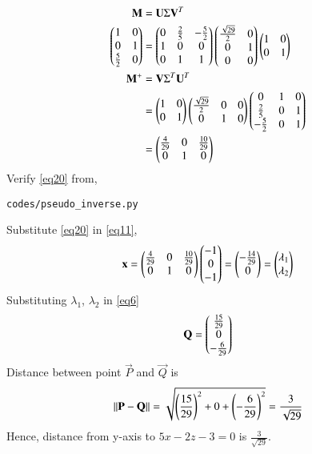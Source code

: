 \documentclass[journal,12pt,twocolumn]{IEEEtran}
\begin{document}
\begin{align}
	\label{eq16}\mathbf{M} &= \mathbf{U}\Sigma\mathbf{V}^T\\
	\label{eq17}\begin{pmatrix}1 & 0\\0 & 1\\\frac{5}{2} & 0\end{pmatrix} &= \begin{pmatrix}0 & \frac{2}{5} & -\frac{5}{2}\\1 & 0 & 0\\0 & 1 & 1\end{pmatrix}\begin{pmatrix}\frac{\sqrt{29}}{2} & 0 \\0 & 1\\0 & 0\end{pmatrix} \begin{pmatrix}1 & 0\\0 & 1\end{pmatrix}\\
	\label{eq18}\mathbf{M}^{+} &= \mathbf{V}\Sigma^T\mathbf{U}^T\\
	\label{eq19}&= \begin{pmatrix}1 & 0\\0 & 1\end{pmatrix}\begin{pmatrix}\frac{\sqrt{29}}{2} & 0 & 0\\0 & 1 & 0\end{pmatrix}\begin{pmatrix}0 & 1 & 0\\\frac{2}{5} & 0 & 1\\-\frac{5}{2} & 0 & 1\end{pmatrix}\\
	\label{eq20}&=\begin{pmatrix}\frac{4}{29} & 0 & \frac{10}{29}\\0 & 1 & 0\end{pmatrix}
\end{align}
Verify \eqref{eq20} from,
\begin{lstlisting}
codes/pseudo_inverse.py
\end{lstlisting}
Substitute \eqref{eq20} in \eqref{eq11},
\begin{align}\label{23}
	\mathbf{x} = \begin{pmatrix}\frac{4}{29} & 0 & \frac{10}{29}\\0 & 1 & 0\end{pmatrix}\begin{pmatrix}-1\\0\\-1\end{pmatrix} = \begin{pmatrix}-\frac{14}{29}\\0\end{pmatrix} = \begin{pmatrix}\lambda_1 \\ \lambda_2\end{pmatrix}
\end{align}
Substituting $\lambda_1$, $\lambda_2$ in \eqref{eq6}
\begin{equation}
	\mathbf{Q} = \begin{pmatrix}\frac{15}{29}\\0\\-\frac{6}{29}\end{pmatrix}
\end{equation}
Distance between point $\vec{P}$ and $\vec{Q}$ is
\begin{align}
	\left\lVert\mathbf{P}-\mathbf{Q}\right\rVert = \sqrt{\left(\frac{15}{29}\right)^2 + 0 + \left(-\frac{6}{29}\right)^2} = \frac{3}{\sqrt{29}}
\end{align}
Hence, distance from y-axis to $5x - 2z - 3 = 0$ is $\frac{3}{\sqrt{29}}$.\\\\
\end{document}

